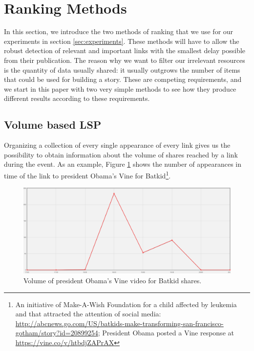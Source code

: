 \documentclass{sig-alternate}
\begin{document}
\section{Ranking Methods}
\label{sec:ranking_methods}
In this section, we introduce the two methods of ranking that we use for our experiments in section \ref{sec:experiments}. These methods will have to allow the robust detection of relevant and important links with the smallest delay possible from their publication. The reason why we want to filter our irrelevant resources is the quantity of data usually shared: it usually outgrows the number of items that could be used for building a story. These are competing requirements, and we start in this paper with two very simple methods to see how they produce different results according to these requirements.

\subsection{Volume based LSP}
\label{sec:volume_based_links_selection}
Organizing a collection of every single appearance of every link gives us the possibility to obtain information about the volume of shares reached by a link during the event. As an example, Figure \ref{fig:batkid_whitehouse_volume} shows the number of appearances in time of the link to president Obama's Vine for Batkid\footnote{An initiative of Make-A-Wish Foundation for a child affected by leukemia and that attracted the attention of social media: \url{http://abcnews.go.com/US/batkids-make-transforming-san-francisco-gotham/story?id=20899254}; President Obama posted a Vine response at \url{https://vine.co/v/htbdjZAPrAX}}.
\begin{figure}[htbp]
  \centering
  \includegraphics[width=\linewidth]{Figures/batkid_whitehouse_volume.png}
  \caption{Volume of president Obama's Vine video for Batkid shares.}
  \label{fig:batkid_whitehouse_volume}
\end{figure}
\end{document}
